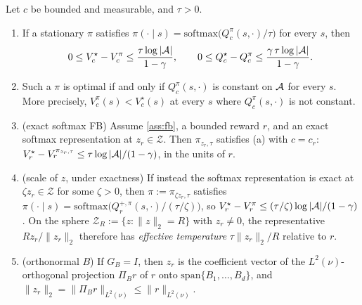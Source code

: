 \begin{proposition}\label{prop:fb-softmax}
Let $c$ be bounded and measurable, and $\tau>0$.
\begin{enumerate}[nosep,label=(\alph*)]
\item If a stationary $\pi$ satisfies $\pi(\cdot\mid s)=\mathrm{softmax}\big(Q^\pi_c(s,\cdot)/\tau\big)$ for every $s$, then
  \[0\le V^\star_c-V^\pi_c\le\frac{\tau\log|\mathcal{A}|}{1-\gamma},\qquad0\le Q^\star_c-Q^\pi_c\le\frac{\gamma\,\tau\log|\mathcal{A}|}{1-\gamma}.\]
\item Such a $\pi$ is optimal if and only if $Q^\pi_c(s,\cdot)$ is constant on $\mathcal{A}$ for every $s$. More precisely, $V^\pi_c(s)<V^\star_c(s)$ at every $s$ where $Q^\pi_c(s,\cdot)$ is not constant.
\item (exact softmax FB) Assume \cref{ass:fb}, a bounded reward $r$, and an exact softmax representation at $z_r\in\mathcal Z$.
  Then $\pi_{z_r,\tau}$ satisfies (a) with $c=c_r$: $V^\star_r-V^{\pi_{z_r,\tau}}_r\le\tau\log|\mathcal{A}|/(1-\gamma)$, in the units of $r$.
\item (scale of $z$, under exactness) If instead the softmax representation is exact at $\zeta z_r\in\mathcal Z$ for some $\zeta>0$, then $\pi:=\pi_{\zeta z_r,\tau}$ satisfies $\pi(\cdot\mid s)=\mathrm{softmax}\big(Q^{+,\pi}_r(s,\cdot)/(\tau/\zeta)\big)$, so $V^\star_r-V^\pi_r\le(\tau/\zeta)\log|\mathcal{A}|/(1-\gamma)$.
  On the sphere $\mathcal Z_R:=\{z:\|z\|_2=R\}$ with $z_r\ne0$, the representative $Rz_r/\|z_r\|_2$ therefore has \emph{effective temperature} $\tau\|z_r\|_2/R$ relative to $r$.
\item (orthonormal $B$) If $G_B=I$, then $z_r$ is the coefficient vector of the $L^2(\nu)$-orthogonal projection $\Pi_Br$ of $r$ onto $\mathrm{span}\{B_1,\dots,B_d\}$, and $\|z_r\|_2=\|\Pi_Br\|_{L^2(\nu)}\le\|r\|_{L^2(\nu)}$.
\end{enumerate}
\end{proposition}
